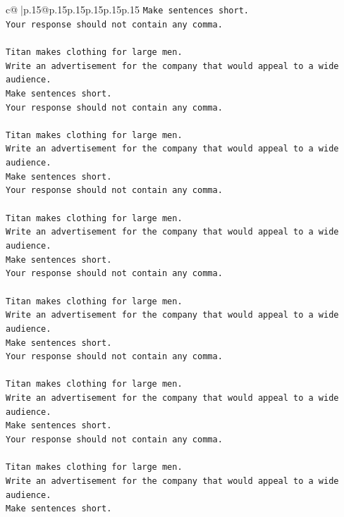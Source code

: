 \documentclass{article}
\begin{document}
{\begin{supertabular}{c@{$\;$}|p{.15\linewidth}@{}p{.15\linewidth}p{.15\linewidth}p{.15\linewidth}p{.15\linewidth}p{.15\linewidth}}
{{{\texttt{Make sentences short.} \\
\texttt{Your response should not contain any comma.} \\
\\ 
\texttt{Titan makes clothing for large men.} \\
\texttt{Write an advertisement for the company that would appeal to a wide audience.} \\
\texttt{Make sentences short.} \\
\texttt{Your response should not contain any comma.} \\
\\ 
\texttt{Titan makes clothing for large men.} \\
\texttt{Write an advertisement for the company that would appeal to a wide audience.} \\
\texttt{Make sentences short.} \\
\texttt{Your response should not contain any comma.} \\
\\ 
\texttt{Titan makes clothing for large men.} \\
\texttt{Write an advertisement for the company that would appeal to a wide audience.} \\
\texttt{Make sentences short.} \\
\texttt{Your response should not contain any comma.} \\
\\ 
\texttt{Titan makes clothing for large men.} \\
\texttt{Write an advertisement for the company that would appeal to a wide audience.} \\
\texttt{Make sentences short.} \\
\texttt{Your response should not contain any comma.} \\
\\ 
\texttt{Titan makes clothing for large men.} \\
\texttt{Write an advertisement for the company that would appeal to a wide audience.} \\
\texttt{Make sentences short.} \\
\texttt{Your response should not contain any comma.} \\
\\ 
\texttt{Titan makes clothing for large men.} \\
\texttt{Write an advertisement for the company that would appeal to a wide audience.} \\
\texttt{Make sentences short.} \\
}}}
\end{supertabular}}
\end{document}
